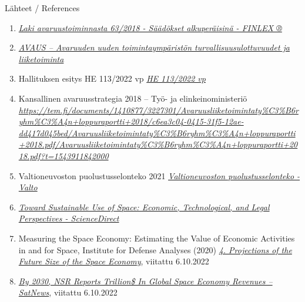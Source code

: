 \protect\hypertarget{anchor-14}{}{}

\protect\hypertarget{anchor-15}{}{}Lähteet / References

\begin{enumerate}
\def\labelenumi{\arabic{enumi}.}
\item
  \href{https://www.finlex.fi/fi/laki/alkup/2018/20180063}{\emph{Laki
  avaruustoiminnasta 63/2018 - Säädökset alkuperäisinä - FINLEX ®}}
\item
  \href{https://julkaisut.valtioneuvosto.fi/bitstream/handle/10024/162062/VNTEAS_2020_08.pdf}{\emph{AVAUS
  -- Avaruuden uuden toimintaympäristön turvallisuusulottuvuudet ja
  liiketoiminta}}
\item
  Hallituksen esitys HE 113/2022 vp
  \href{https://www.eduskunta.fi/FI/vaski/HallituksenEsitys/Sivut/HE_113+2022.aspx}{\emph{HE
  113/2022 vp}}
\item
  Kansallinen avaruusstrategia 2018 -- Työ- ja elinkeinoministeriö\emph{
  }\href{https://tem.fi/documents/1410877/3227301/Avaruusliiketoimintaty\%C3\%B6ryhm\%C3\%A4n+loppuraportti+2018/c6ea3c04-0415-31f5-12ae-dd417d045bed/Avaruusliiketoimintaty\%C3\%B6ryhm\%C3\%A4n+loppuraportti+2018.pdf/Avaruusliiketoimintaty\%C3\%B6ryhm\%C3\%A4n+loppuraportti+2018.pdf?t=1543911842000}{\emph{https://tem.fi/documents/1410877/3227301/Avaruusliiketoimintaty\%C3\%B6ryhm\%C3\%A4n+loppuraportti+2018/c6ea3c04-0415-31f5-12ae-dd417d045bed/Avaruusliiketoimintaty\%C3\%B6ryhm\%C3\%A4n+loppuraportti+2018.pdf/Avaruusliiketoimintaty\%C3\%B6ryhm\%C3\%A4n+loppuraportti+2018.pdf?t=1543911842000}}
\item
  Valtioneuvoston puolustusselonteko 2021
  \href{http://urn.fi/URN:ISBN:978-952-383-820-8}{\emph{Valtioneuvoston
  puolustusselonteko - Valto}}
\item
  \href{https://www.sciencedirect.com/science/article/pii/S0265964621000205}{\emph{Toward
  Sustainable Use of Space: Economic, Technological, and Legal
  Perspectives - ScienceDirect}}
\item
  Measuring the Space Economy: Estimating the Value of Economic
  Activities in and for Space, Institute for Defense Analyses (2020)
  \href{https://www.jstor.org/stable/pdf/resrep25331.7.pdf}{\emph{4.
  Projections of the Future Size of the Space Economy}}, viitattu
  6.10.2022
\item
  \href{https://news.satnews.com/2022/01/27/by-2030-nsr-reports-trillion-in-global-space-economy-revenues/}{\emph{By
  2030, NSR Reports Trillion\$ In Global Space Economy Revenues --
  SatNews}}, viitattu 6.10.2022

\end{enumerate}
